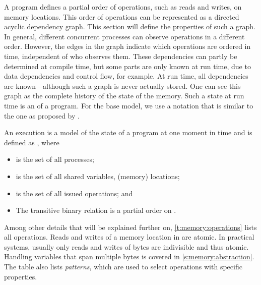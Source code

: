 A program defines a partial order of operations, such as reads and writes, on memory locations.
This order of operations can be represented as a directed acyclic dependency graph.
This section will define the properties of such a graph.
In general, different concurrent processes can observe operations in a different order.
However, the edges in the graph indicate which operations are ordered in time, independent of who observes them.
These dependencies can partly be determined at compile time, but some parts are only known at run time, due to data dependencies and control flow, for example.
At run time, all dependencies are known---although such a graph is never actually stored.
One can see this graph as the complete history of the state of the memory.
Such a state at run time is an \emph{} of a program.
For the base model, we use a notation that is similar to the one as proposed by \citet{steinke:unified}.
\begin{definition}[Execution]
	An execution \SYMExec* is a model of the state of a program at one moment in time and is defined as \SYMExecdef, where
	\begin{itemize}
	\item \SYMProc* is the set of all processes;
	\item \SYMVar* is the set of all shared variables, \ie (memory) locations;
	\item \SYMOp* is the set of all issued operations; and
	\item The transitive binary relation \SYMOrder* is a partial order on \SYMOp.
	\end{itemize}
\end{definition}

Among other details that will be explained further on, \vref{t:memory:operations} lists all operations.
Reads and writes of a memory location in \SYMVar are atomic.
In practical systems, usually only reads and writes of bytes are indivisible and thus atomic.
Handling variables that span multiple bytes is covered in \cref{s:memory:abstraction}.
The table also lists \emph{patterns}, which are used to select operations with specific properties.

